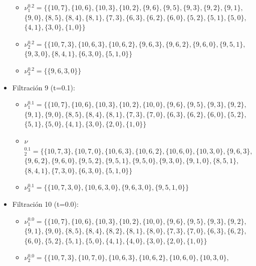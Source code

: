 \documentclass[12pt, a4paper, twoside]{book}
\numberwithin{equation}{section}
\theoremstyle{definition}
\newenvironment{ejem}
  {\pushQED{\qed}\renewcommand{\qedsymbol}{$\blacktriangleleft$}\ejemplo}
  {\popQED\endejemplo}
\theoremstyle{remark}
\theoremstyle{plain}
\begin{document}
\begin{ejem}
\begin{itemize}
\begin{itemize}
					\item {\Large $\nu$}$^{0.2}_{1}=\{\{10, 7\},\{10, 6\},\{10, 3\},\{10, 2\},\{9, 6\},\{9, 5\},\{9, 3\},\{9, 2\},\{9, 1\},$\\
							$\{9, 0\},\{8, 5\},\{8, 4\},\{8, 1\},\{7, 3\},\{6, 3\},\{6, 2\},\{6, 0\},\{5, 2\},\{5, 1\},\{5, 0\},$\\
							$\{4, 1\},\{3, 0\},\{1, 0\}\}$
					\item {\Large $\nu$}$^{0.2}_{2}=\{\{10, 7, 3\},\{10, 6, 3\},\{10, 6, 2\},\{9, 6, 3\},\{9, 6, 2\},\{9, 6, 0\},
							\{9, 5, 1\},$\\$\{9, 3, 0\},\{8, 4, 1\},\{6, 3, 0\},\{5, 1, 0\}\}$
					\item {\Large $\nu$}$^{0.2}_{3}=\{\{9, 6, 3, 0\}\}$
				\end{itemize}
			\item Filtración 9 (t=0.1):
				\begin{itemize}
					\item {\Large $\nu$}$^{0.1}_{1}=\{\{10, 7\},\{10, 6\},\{10, 3\},\{10, 2\},\{10, 0\},\{9, 6\},\{9, 5\},\{9, 3\},\{9, 2\},$\\
							$\{9, 1\},\{9, 0\},\{8, 5\},\{8, 4\},\{8, 1\},\{7, 3\},\{7, 0\},\{6, 3\},\{6, 2\},\{6, 0\},\{5, 2\},$\\
						$\{5, 1\},\{5, 0\},\{4, 1\},\{3, 0\},\{2, 0\},\{1, 0\}\}$
					\item {\Large $\nu$}$^{0.1}_{2}=\{\{10, 7, 3\},\{10, 7, 0\},\{10, 6, 3\},\{10, 6, 2\},\{10, 6, 0\},\{10, 3, 0\},\{9, 6, 3\},$
							\\$\{9, 6, 2\},\{9, 6, 0\},\{9, 5, 2\},\{9, 5, 1\},\{9, 5, 0\},\{9, 3, 0\},\{9, 1, 0\},\{8, 5, 1\},$
						\\$\{8, 4, 1\},\{7, 3, 0\},\{6, 3, 0\},\{5, 1, 0\}\}$
					\item {\Large $\nu$}$^{0.1}_{3}=\{\{10, 7, 3, 0\},\{10, 6, 3, 0\},\{9, 6, 3, 0\},\{9, 5, 1, 0\}\}$
				\end{itemize}
			\item Filtración 10 (t=0.0):
				\begin{itemize}
					\item {\Large $\nu$}$^{0.0}_{1}=\{\{10, 7\},\{10, 6\},\{10, 3\},\{10, 2\},\{10, 0\},\{9, 6\},\{9, 5\},\{9, 3\},\{9, 2\},$
							\\$\{9, 1\},\{9, 0\},\{8, 5\},\{8, 4\},\{8, 2\},\{8, 1\},\{8, 0\},\{7, 3\},\{7, 0\},\{6, 3\},\{6, 2\},$
						\\$\{6, 0\},\{5, 2\},\{5, 1\},\{5, 0\},\{4, 1\},\{4, 0\},\{3, 0\},\{2, 0\},\{1, 0\}\}$
					\item {\Large $\nu$}$^{0.0}_{2}=\{\{10, 7, 3\},\{10, 7, 0\},\{10, 6, 3\},\{10, 6, 2\},\{10, 6, 0\},\{10, 3, 0\},$

\end{itemize}
\end{itemize}
\end{ejem}
\end{document}
